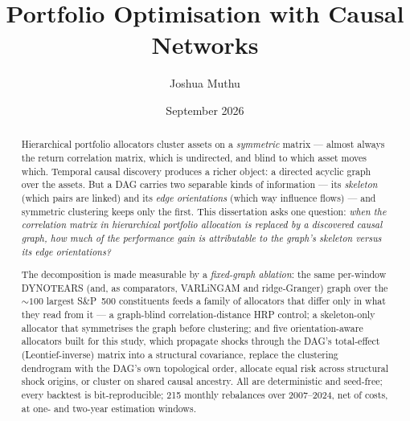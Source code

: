 \documentclass[12pt, a4paper]{report}
\title{Portfolio Optimisation with Causal Networks}
\author{Joshua Muthu}
\date{September 2026}
\begin{document}

\maketitle

\begin{abstract}
\noindent Hierarchical portfolio allocators cluster assets on a
\emph{symmetric} matrix --- almost always the return correlation matrix, which
is undirected, and blind to which asset moves which. Temporal causal discovery
produces a richer object: a directed acyclic graph over the assets. But a DAG
carries two separable kinds of information --- its \emph{skeleton} (which pairs
are linked) and its \emph{edge orientations} (which way influence flows) ---
and symmetric clustering keeps only the first. This dissertation asks one
question: \emph{when the correlation matrix in hierarchical portfolio
allocation is replaced by a discovered causal graph, how much of the
performance gain is attributable to the graph's skeleton versus its edge
orientations?}

The decomposition is made measurable by a \emph{fixed-graph ablation}: the same
per-window DYNOTEARS (and, as comparators, VARLiNGAM and ridge-Granger) graph
over the ${\sim}100$ largest S\&P~500 constituents feeds a family of allocators
that differ only in what they read from it --- a graph-blind
correlation-distance HRP control; a skeleton-only allocator that symmetrises
the graph before clustering; and five orientation-aware allocators built for
this study, which propagate shocks through the DAG's total-effect
(Leontief-inverse) matrix into a structural covariance, replace the clustering
dendrogram with the DAG's own topological order, allocate equal risk across
structural shock origins, or cluster on shared causal ancestry. All are
deterministic and seed-free; every backtest is bit-reproducible; 215 monthly
rebalances over 2007--2024, net of costs, at one- and two-year estimation
windows.


\end{abstract}
\end{document}
